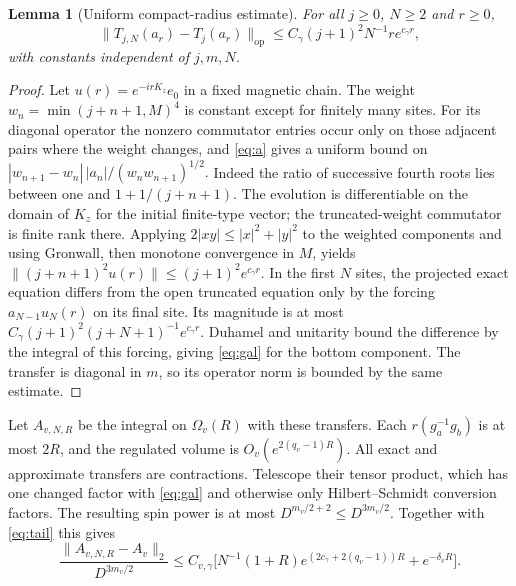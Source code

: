 \documentclass[11pt]{article}
\newtheorem{lemma}[theorem]{Lemma}
\theoremstyle{remark}
\begin{document}
\begin{lemma}[Uniform compact-radius estimate]\label{lem:galerkin}
For all \(j\ge0\), \(N\ge2\) and \(r\ge0\),
\begin{equation}\label{eq:gal}
\|T_{j,N}(a_r)-T_j(a_r)\|_{\mathrm{op}}
\le C_\gamma(j+1)^2N^{-1}r e^{c_\gamma r},
\end{equation}
with constants independent of \(j,m,N\).
\end{lemma}
\begin{proof}
Let \(u(r)=e^{-irK_z}e_0\) in a fixed magnetic chain. The weight \(w_n=\min(j+n+1,M)^4\) is constant except for finitely many sites. For its diagonal operator the nonzero commutator entries occur only on those adjacent pairs where the weight changes, and \eqref{eq:a} gives a uniform bound on
\(
|w_{n+1}-w_n|\,|a_n|/(w_nw_{n+1})^{1/2}.
\)
Indeed the ratio of successive fourth roots lies between one and \(1+1/(j+n+1)\). The evolution is differentiable on the domain of \(K_z\) for the initial finite-type vector; the truncated-weight commutator is finite rank there. Applying \(2|xy|\le |x|^2+|y|^2\) to the weighted components and using Gronwall, then monotone convergence in \(M\), yields \(\|(j+n+1)^2 u(r)\|\le(j+1)^2 e^{c_\gamma r}\). In the first \(N\) sites, the projected exact equation differs from the open truncated equation only by the forcing \(a_{N-1}u_N(r)\) on its final site. Its magnitude is at most \(C_\gamma(j+1)^2(j+N+1)^{-1}e^{c_\gamma r}\). Duhamel and unitarity bound the difference by the integral of this forcing, giving \eqref{eq:gal} for the bottom component. The transfer is diagonal in \(m\), so its operator norm is bounded by the same estimate.
\end{proof}

Let \(A_{v,N,R}\) be the integral on \(\Omega_v(R)\) with these transfers. Each \(r(g_a^{-1}g_b)\) is at most \(2R\), and the regulated volume is \(O_v(e^{2(q_v-1)R})\). All exact and approximate transfers are contractions. Telescope their tensor product, which has one changed factor with \eqref{eq:gal} and otherwise only Hilbert--Schmidt conversion factors. The resulting spin power is at most \(D^{m_v/2+2}\le D^{3m_v/2}\). Together with \eqref{eq:tail} this gives
\begin{equation}\label{eq:local}
\frac{\|A_{v,N,R}-A_v\|_2}{D^{3m_v/2}}
\le C_{v,\gamma}\big[N^{-1}(1+R)e^{(2c_\gamma+2(q_v-1))R}+e^{-\delta_vR}\big].
\end{equation}
\end{document}
